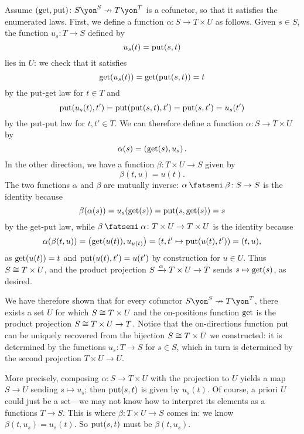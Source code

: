 \documentclass[Book-Poly]{subfiles}
\begin{document}
\begin{example}
Assume $(\lensget,\lensput)\colon S\yon^S\cof T\yon^T$ is a cofunctor, so that it satisfies the enumerated laws.
First, we define a function $\alpha\colon S\to T\times U$ as follows.
Given $s\in S$, the function $u_s\colon T\to S$ defined by
\[
    u_s(t)=\mathrm{put}(s,t)
\]
lies in $U$: we check that it satisfies
\[
    \mathrm{get}(u_s(t))=\mathrm{get}(\mathrm{put}(s,t))=t
\]
by the put-get law for $t\in T$ and
\[
    \mathrm{put}(u_s(t),t')=\mathrm{put}(\mathrm{put}(s,t),t')=\mathrm{put}(s,t')=u_s(t')
\]
by the put-put law for $t,t'\in T$.
We can therefore define a function $\alpha\colon S\to T\times U$ by
\[
    \alpha(s)=\left(\mathrm{get}(s),u_s\right).
\]
In the other direction, we have a function $\beta\colon T\times U\to S$ given by
\[
    \beta(t,u)=u(t).
\]
The two functions $\alpha$ and $\beta$ are mutually inverse: $\alpha\then\beta\colon S\to S$ is the identity because
\[
    \beta(\alpha(s))=u_s(\mathrm{get}(s))=\mathrm{put}(s,\mathrm{get}(s))=s
\]
by the get-put law, while $\beta\then\alpha\colon T\times U\to T\times U$ is the identity because
\[
    \alpha(\beta(t,u))=\left(\mathrm{get}(u(t)),u_{u(t)}\right)=(t,t'\mapsto\mathrm{put}(u(t),t'))=(t,u),
\]
as $\mathrm{get}(u(t))=t$ and $\mathrm{put}(u(t),t')=u(t')$ by construction for $u\in U$.
Thus $S\cong T\times U$, and the product projection $S\xrightarrow{\alpha} T\times U\to T$ sends $s\mapsto\mathrm{get}(s)$, as desired.

We have therefore shown that for every cofunctor $S\yon^S\cof T\yon^T$, there exists a set $U$ for which $S\cong T\times U$ and the on-positions function $\mathrm{get}$ is the product projection $S\cong T\times U\to T$.
Notice that the on-directions function $\mathrm{put}$ can be uniquely recovered from the bijection $S\cong T\times U$ we constructed: it is determined by the functions $u_s\colon T\to S$ for $s\in S$, which in turn is determined by the second projection $T\times U\to U$.

More precisely, composing $\alpha\colon S\to T\times U$ with the projection to $U$ yields a map $S\to U$ sending $s\mapsto u_s$; then $\mathrm{put}(s,t)$ is given by $u_s(t)$.
Of course, a priori $U$ could just be a set---we may not know how to interpret its elements as a functions $T\to S$.
This is where $\beta\colon T\times U\to S$ comes in: we know $\beta(t,u_s)=u_s(t)$.
So $\mathrm{put}(s,t)$ must be $\beta(t,u_s)$.
\end{example}
\end{document}
